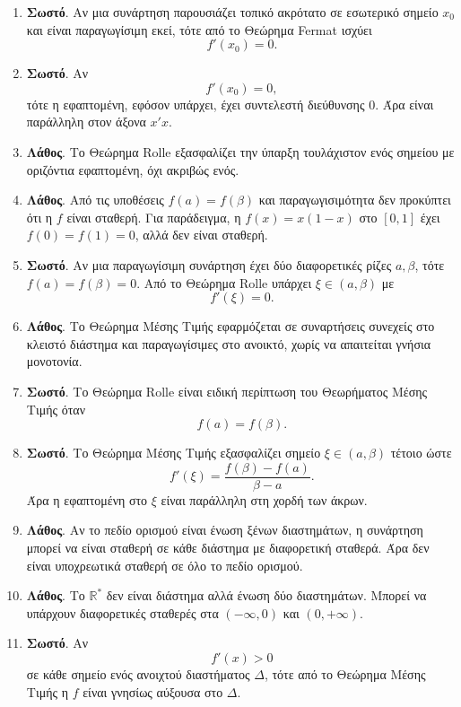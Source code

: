 \begin{enumerate}[label=\textbf{2.\arabic*.}]
\item \textbf{Σωστό}. Αν μια συνάρτηση παρουσιάζει τοπικό ακρότατο σε εσωτερικό σημείο $x_0$ και είναι παραγωγίσιμη εκεί, τότε από το Θεώρημα Fermat ισχύει
\[
f'(x_0)=0.
\]

\item \textbf{Σωστό}. Αν
\[
f'(x_0)=0,
\]
τότε η εφαπτομένη, εφόσον υπάρχει, έχει συντελεστή διεύθυνσης $0$. Άρα είναι παράλληλη στον άξονα $x'x$.

\item \textbf{Λάθος}. Το Θεώρημα Rolle εξασφαλίζει την ύπαρξη τουλάχιστον ενός σημείου με οριζόντια εφαπτομένη, όχι ακριβώς ενός.

\item \textbf{Λάθος}. Από τις υποθέσεις $f(a)=f(\beta)$ και παραγωγισιμότητα δεν προκύπτει ότι η $f$ είναι σταθερή. Για παράδειγμα, η $f(x)=x(1-x)$ στο $[0,1]$ έχει $f(0)=f(1)=0$, αλλά δεν είναι σταθερή.

\item \textbf{Σωστό}. Αν μια παραγωγίσιμη συνάρτηση έχει δύο διαφορετικές ρίζες $a,\beta$, τότε $f(a)=f(\beta)=0$. Από το Θεώρημα Rolle υπάρχει $\xi\in(a,\beta)$ με
\[
f'(\xi)=0.
\]

\item \textbf{Λάθος}. Το Θεώρημα Μέσης Τιμής εφαρμόζεται σε συναρτήσεις συνεχείς στο κλειστό διάστημα και παραγωγίσιμες στο ανοικτό, χωρίς να απαιτείται γνήσια μονοτονία.

\item \textbf{Σωστό}. Το Θεώρημα Rolle είναι ειδική περίπτωση του Θεωρήματος Μέσης Τιμής όταν
\[
f(a)=f(\beta).
\]

\item \textbf{Σωστό}. Το Θεώρημα Μέσης Τιμής εξασφαλίζει σημείο $\xi\in(a,\beta)$ τέτοιο ώστε
\[
f'(\xi)=\frac{f(\beta)-f(a)}{\beta-a}.
\]
Άρα η εφαπτομένη στο $\xi$ είναι παράλληλη στη χορδή των άκρων.

\item \textbf{Λάθος}. Αν το πεδίο ορισμού είναι ένωση ξένων διαστημάτων, η συνάρτηση μπορεί να είναι σταθερή σε κάθε διάστημα με διαφορετική σταθερά. Άρα δεν είναι υποχρεωτικά σταθερή σε όλο το πεδίο ορισμού.

\item \textbf{Λάθος}. Το $\mathbb{R}^*$ δεν είναι διάστημα αλλά ένωση δύο διαστημάτων. Μπορεί να υπάρχουν διαφορετικές σταθερές στα $(-\infty,0)$ και $(0,+\infty)$.

\item \textbf{Σωστό}. Αν
\[
f'(x)>0
\]
σε κάθε σημείο ενός ανοιχτού διαστήματος $\varDelta$, τότε από το Θεώρημα Μέσης Τιμής η $f$ είναι γνησίως αύξουσα στο $\varDelta$.


\end{enumerate}

